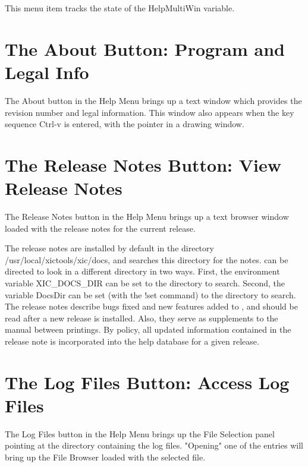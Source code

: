 This menu item tracks the state of the {\et HelpMultiWin} variable.


\section{The {\cb About} Button: Program and Legal Info}
The {\cb About} button in the {\cb Help Menu} brings up a text window
which provides the {\Xic} revision number and legal information.  This
window also appears when the key sequence {\kb Ctrl-v} is entered,
with the pointer in a drawing window.


\section{The {\cb Release Notes} Button: View Release Notes}
The {\cb Release Notes} button in the {\cb Help Menu} brings up a text
browser window loaded with the release notes for the current {\Xic}
release.

The release notes are installed by default in the directory {\vt
/usr/local/xictools/xic/docs}, and {\Xic} searches this
directory for the notes.  {\Xic} can be directed to look in a
different directory in two ways.  First, the environment variable {\et
XIC\_DOCS\_DIR} can be set to the directory to search.  Second, the
variable {\et DocsDir} can be set (with the {\cb !set} command) to the
directory to search.  The release notes describe bugs fixed and new
features added to {\Xic}, and should be read after a new release is
installed.  Also, they serve as supplements to the manual between
printings.  By policy, all updated information contained in the
release note is incorporated into the help database for a given
release.


\section{The {\cb Log Files} Button: Access Log Files}
The {\cb Log Files} button in the {\cb Help Menu} brings up the {\cb
File Selection} panel pointing at the directory containing the log
files.  "Opening" one of the entries will bring up the {\cb File
Browser} loaded with the selected file.

